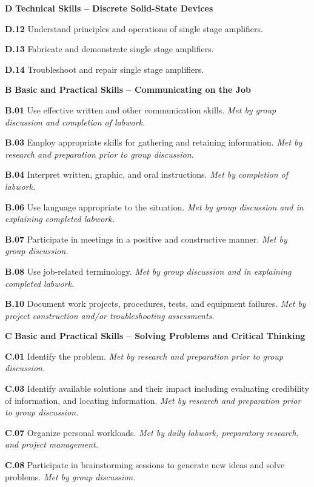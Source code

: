 \vskip 5pt

\medskip
\item{\bf D} {\bf Technical Skills -- Discrete Solid-State Devices}
\item{\bf D.12} Understand principles and operations of single stage amplifiers.
\item{\bf D.13} Fabricate and demonstrate single stage amplifiers.
\item{\bf D.14} Troubleshoot and repair single stage amplifiers.
\medskip

\vskip 5pt

\medskip
\item{\bf B} {\bf Basic and Practical Skills -- Communicating on the Job}
\item{\bf B.01} Use effective written and other communication skills.  {\it Met by group discussion and completion of labwork.}
\item{\bf B.03} Employ appropriate skills for gathering and retaining information.  {\it Met by research and preparation prior to group discussion.}
\item{\bf B.04} Interpret written, graphic, and oral instructions.  {\it Met by completion of labwork.}
\item{\bf B.06} Use language appropriate to the situation.  {\it Met by group discussion and in explaining completed labwork.}
\item{\bf B.07} Participate in meetings in a positive and constructive manner.  {\it Met by group discussion.}
\item{\bf B.08} Use job-related terminology.  {\it Met by group discussion and in explaining completed labwork.}
\item{\bf B.10} Document work projects, procedures, tests, and equipment failures.  {\it Met by project construction and/or troubleshooting assessments.}
\item{\bf C} {\bf Basic and Practical Skills -- Solving Problems and Critical Thinking}
\item{\bf C.01} Identify the problem.  {\it Met by research and preparation prior to group discussion.}
\item{\bf C.03} Identify available solutions and their impact including evaluating credibility of information, and locating information.  {\it Met by research and preparation prior to group discussion.}
\item{\bf C.07} Organize personal workloads.  {\it Met by daily labwork, preparatory research, and project management.}
\item{\bf C.08} Participate in brainstorming sessions to generate new ideas and solve problems.  {\it Met by group discussion.}
